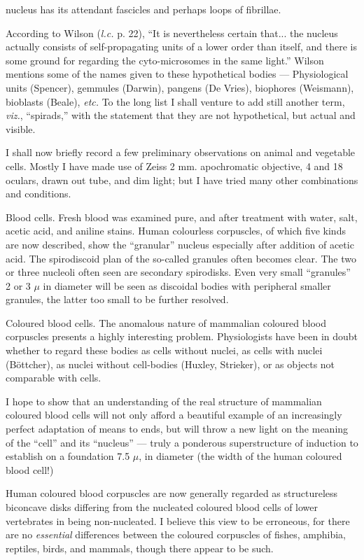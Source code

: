 \documentclass[a4paper, 12pt, oneside]{article}
\begin{document}
nucleus has its attendant fascicles and perhaps loops of fibrillae.

According to Wilson (\emph{l.c.} p. 22), ``It is nevertheless certain that... the nucleus actually consists of self-propagating units of a lower order than itself, and there is some ground for regarding the cyto-microsomes in the same light.'' Wilson mentions some of the names given to these hypothetical bodies --- Physiological units (Spencer), gemmules (Darwin), pangens (De Vries), biophores (Weismann), bioblasts (Beale), \emph{etc.} To the long list I shall venture to add still another term, \emph{viz.}, ``spirads,'' with the statement that they are not hypothetical, but actual and visible.

I shall now briefly record a few preliminary observations on animal and vegetable cells. Mostly I have made use of Zeiss 2 mm. apochromatic objective, 4 and 18 oculars, drawn out tube, and dim light; but I have tried many other combinations and conditions.

Blood cells. Fresh blood was examined pure, and after treatment with water, salt, acetic acid, and aniline stains. Human colourless corpuscles, of which five kinds are now described, show the ``granular'' nucleus especially after addition of acetic acid. The spirodiscoid plan of the so-called granules often becomes clear. The two or three nucleoli often seen are secondary spirodisks. Even very small ``granules'' 2 or 3 $\mu$ in diameter will be seen as discoidal bodies with peripheral smaller granules, the latter too small to be further resolved.

Coloured blood cells. The anomalous nature of mammalian coloured blood corpuscles presents a highly interesting problem. Physiologists have been in doubt whether to regard these bodies as cells without nuclei, as cells with nuclei (Böttcher), as nuclei without cell-bodies (Huxley, Strieker), or as objects not comparable with cells.

I hope to show that an understanding of the real structure of mammalian coloured blood cells will not only afford a beautiful example of an increasingly perfect adaptation of means to ends, but will throw a new light on the meaning of the ``cell'' and its ``nucleus'' --- truly a ponderous superstructure of induction to establish on a foundation 7.5 $\mu$, in diameter (the width of the human coloured blood cell!)

Human coloured blood corpuscles are now generally regarded as structureless biconcave disks differing from the nucleated coloured blood cells of lower vertebrates in being non-nucleated. I believe this view to be erroneous, for there are no \emph{essential} differences between the coloured corpuscles of fishes, amphibia, reptiles, birds, and mammals, though there appear to be such.
\end{document}
